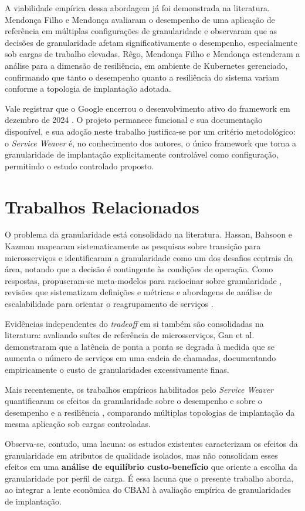 A viabilidade empírica dessa abordagem já foi demonstrada na literatura. Mendonça Filho e Mendonça \cite{mendonca2024serviceweaver} avaliaram o desempenho de uma aplicação de referência em múltiplas configurações de granularidade e observaram que as decisões de granularidade afetam significativamente o desempenho, especialmente sob cargas de trabalho elevadas. Rêgo, Mendonça Filho e Mendonça \cite{rego2025granularity} estenderam a análise para a dimensão de resiliência, em ambiente de Kubernetes gerenciado, confirmando que tanto o desempenho quanto a resiliência do sistema variam conforme a topologia de implantação adotada.

Vale registrar que o Google encerrou o desenvolvimento ativo do framework em dezembro de 2024 \cite{serviceweaver}. O projeto permanece funcional e sua documentação disponível, e sua adoção neste trabalho justifica-se por um critério metodológico: o \textit{Service Weaver} é, no conhecimento dos autores, o único framework que torna a granularidade de implantação explicitamente controlável como configuração, permitindo o estudo controlado proposto.

\section{Trabalhos Relacionados}
\label{sec:trabalhos-relacionados}

O problema da granularidade está consolidado na literatura. Hassan, Bahsoon e Kazman \cite{hassan2020microservice} mapearam sistematicamente as pesquisas sobre transição para microsserviços e identificaram a granularidade como um dos desafios centrais da área, notando que a decisão é contingente às condições de operação. Como respostas, propuseram-se meta-modelos para raciocinar sobre granularidade \cite{hassan2017ambients}, revisões que sistematizam definições e métricas \cite{verarivera2021granularity} e abordagens de análise de escalabilidade para orientar o reagrupamento de serviços \cite{hassan2020microservice}.

Evidências independentes do \textit{tradeoff} em si também são consolidadas na literatura: avaliando suítes de referência de microsserviços, Gan et al. \cite{gan2019deathstarbench} demonstraram que a latência de ponta a ponta se degrada à medida que se aumenta o número de serviços em uma cadeia de chamadas, documentando empiricamente o custo de granularidades excessivamente finas.

Mais recentemente, os trabalhos empíricos habilitados pelo \textit{Service Weaver} quantificaram os efeitos da granularidade sobre o desempenho \cite{mendonca2024serviceweaver} e sobre o desempenho e a resiliência \cite{rego2025granularity}, comparando múltiplas topologias de implantação da mesma aplicação sob cargas controladas.

Observa-se, contudo, uma lacuna: os estudos existentes caracterizam os efeitos da granularidade em atributos de qualidade isolados, mas não consolidam esses efeitos em uma \textbf{análise de equilíbrio custo-benefício} que oriente a escolha da granularidade por perfil de carga. É essa lacuna que o presente trabalho aborda, ao integrar a lente econômica do CBAM \cite{asundi2001cbam} à avaliação empírica de granularidades de implantação.
